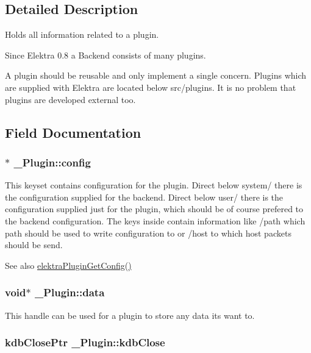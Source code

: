\subsection{Detailed Description}
Holds all information related to a plugin.

Since Elektra 0.8 a Backend consists of many plugins.

A plugin should be reusable and only implement a single concern. Plugins which are supplied with Elektra are located below src/plugins. It is no problem that plugins are developed external too. 

\subsection{Field Documentation}
\hypertarget{struct__Plugin_ab2515d2e11eec337550300d6f56a3d4b}{
\subsubsection[{config}]{$\ast$ {\bf \_\-Plugin::config}}}
\label{struct__Plugin_ab2515d2e11eec337550300d6f56a3d4b}
This keyset contains configuration for the plugin. Direct below system/ there is the configuration supplied for the backend. Direct below user/ there is the configuration supplied just for the plugin, which should be of course prefered to the backend configuration. The keys inside contain information like /path which path should be used to write configuration to or /host to which host packets should be send. \begin{DoxySeeAlso}{See also}
\hyperlink{group__plugin_ga644bead796506c172817724051c977c9}{elektraPluginGetConfig()} 
\end{DoxySeeAlso}
\hypertarget{struct__Plugin_ad2e6fd0b76939b20008e9cc046a06779}{
\subsubsection[{data}]{\setlength{\rightskip}{0pt plus 5cm}void$\ast$ {\bf \_\-Plugin::data}}}
\label{struct__Plugin_ad2e6fd0b76939b20008e9cc046a06779}
This handle can be used for a plugin to store any data its want to. \hypertarget{struct__Plugin_a5b0b2cc22ad5dcc7ec0eb570c2c6ff4b}{
\subsubsection[{kdbClose}]{\setlength{\rightskip}{0pt plus 5cm}kdbClosePtr {\bf \_\-Plugin::kdbClose}}}
